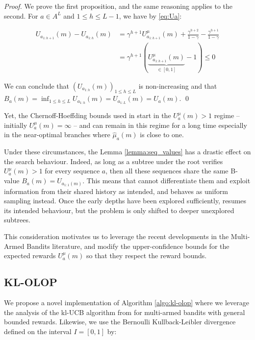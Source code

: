 \documentclass[runningheads, envcountsame, a4paper]{llncs}
\newcommand{\citep}{\cite}
\begin{document}
\begin{proof}
We prove the first proposition, and the same reasoning applies to the second. For $a\in A^L$ and $1 \leq h \leq L - 1$, we have by \eqref{eq:Ua}:


\begin{align*}
    U_{a_{1:h+1}}(m) - U_{a_{1:h}}(m) &= \gamma^{h+1}U^{\mu}_{a_{1:h+1}}(m) + \frac{\gamma^{h+2}}{1-\gamma} - \frac{\gamma^{h+1}}{1-\gamma}\\
    &= \gamma^{h+1}(\underbrace{U^{\mu}_{a_{1:h+1}}(m)}_{\in [0, 1]} - 1) \leq 0
\end{align*}


\noindent
We can conclude that $(U_{a_{1:h}}(m))_{1\leq h \leq L}$ is non-increasing and that $B_a(m) = \inf_{1 \leq h \leq L} U_{a_{1:h}}(m) = U_{a_{1:L}}(m) = U_a(m)$.
\qed
\end{proof}

Yet, the Chernoff-Hoeffding bounds used in \OLOP start in the $U^{\mu}_a(m) > 1$ regime -- initially $U^{\mu}_a(m) = \infty$ -- and can remain in this regime for a long time especially in the near-optimal branches where $\hat{\mu}_a(m)$ is close to one.

Under these circumstances, the Lemma \ref{lemma:seq_values} has a drastic effect on the search behaviour. Indeed, as long as a subtree under the root verifies $U^{\mu}_a(m) > 1$ for every sequence $a$, then all these sequences share the same B-value $B_a(m) = U_{a_{1:1}(m)}$. This means that \OLOP cannot differentiate them and exploit information from their shared history as intended, and behaves as uniform sampling instead.
Once the early depths have been explored sufficiently, \OLOP resumes its intended behaviour, but the problem is only shifted to deeper unexplored subtrees.
 
 This consideration motivates us to leverage the recent developments in the Multi-Armed Bandits literature, and modify the upper-confidence bounds for the expected rewards $U^\mu_a(m)$ so that they respect the reward bounds.


\subsection{KL-OLOP}
\label{sec:kl-olop-kl-olop}

\noindent
We propose a novel implementation of Algorithm \ref{algo:kl-olop} where we leverage the analysis of the kl-UCB algorithm from \citep{Cappe2013} for multi-armed bandits with general bounded rewards.
Likewise, we use the Bernoulli Kullback-Leibler divergence defined on the interval $I=[0,1]$ by:
\end{document}
